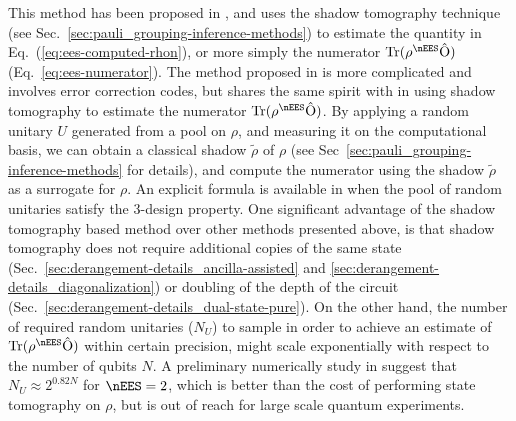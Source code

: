 This method has been proposed in \citet{Seif2022ShadowDistillation,Hu2022LogicalShadowTomography}, and uses the shadow tomography technique (see Sec.~\ref{sec:pauli_grouping-inference-methods}) to estimate the quantity
in Eq.~(\ref{eq:ees-computed-rhon}), or more simply the numerator  $\mathrm{Tr( \rho^{\nEES} \hat{O})}$ (Eq.~\ref{eq:ees-numerator}).
The method proposed in \citet{Hu2022LogicalShadowTomography} is more complicated and involves error correction codes, but shares the same spirit with \citet{Seif2022ShadowDistillation} in using shadow tomography to estimate the numerator $\mathrm{Tr( \rho^{\nEES} \hat{O})}$.
By applying a random unitary $U$ generated from a pool on $\rho$, and measuring it on the computational basis, we can obtain a classical shadow $\tilde{\rho}$ of $\rho$ (see Sec~\ref{sec:pauli_grouping-inference-methods} for details), and compute the numerator using the shadow $\tilde{\rho}$ as a surrogate for $\rho$.
An explicit formula is available in \citet{Seif2022ShadowDistillation} when the pool of random unitaries satisfy the 3-design property. 
One significant advantage of the shadow tomography based method over other methods presented above, is that shadow tomography does not require additional copies of the same state (Sec.~\ref{sec:derangement-details_ancilla-assisted} and \ref{sec:derangement-details_diagonalization})
or doubling of the depth of the circuit (Sec.~\ref{sec:derangement-details_dual-state-pure}).
On the other hand, the number of required random unitaries ($N_U$) to sample in order to
achieve an estimate of $\mathrm{Tr( \rho^{\nEES} \hat{O})}$ within certain precision, 
might scale exponentially with respect to the number of qubits $N$. A preliminary numerically study in \citet{Seif2022ShadowDistillation} suggest that $N_U\approx 2^{0.82N}$ for $\nEES=2$, which is better than the cost of performing state tomography on $\rho$,
but is out of reach for large scale quantum experiments.